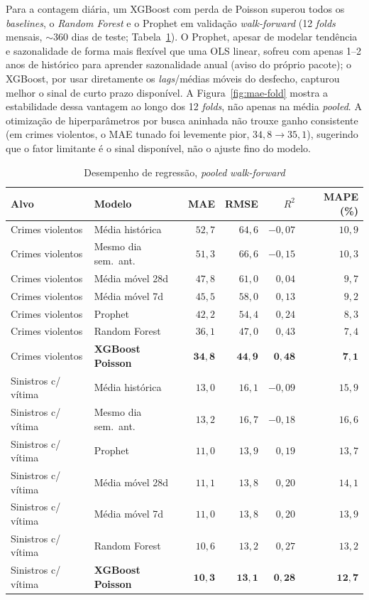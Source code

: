 \documentclass[12pt]{article}
\begin{document}
Para a contagem diária, um XGBoost com perda de Poisson superou todos os
\emph{baselines}, o \emph{Random Forest} e o Prophet \cite{taylor2018} em
validação \emph{walk-forward} (12 \emph{folds} mensais, $\sim$360 dias de
teste; Tabela~\ref{tab:regressao}). O Prophet, apesar de modelar
tendência e sazonalidade de forma mais flexível que uma OLS linear,
sofreu com apenas 1--2 anos de histórico para aprender sazonalidade
anual (aviso do próprio pacote); o XGBoost, por usar diretamente os
\emph{lags}/médias móveis do desfecho, capturou melhor o sinal de curto
prazo disponível. A Figura~\ref{fig:mae-fold} mostra a estabilidade dessa
vantagem ao longo dos 12 \emph{folds}, não apenas na média \emph{pooled}.
A otimização de hiperparâmetros por busca aninhada não trouxe ganho
consistente (em crimes violentos, o MAE tunado foi levemente pior,
$34,8\rightarrow35,1$), sugerindo que o fator limitante é o sinal
disponível, não o ajuste fino do modelo.

\begin{table}[ht]
\centering
\caption{Desempenho de regressão, \emph{pooled} \emph{walk-forward}}
\label{tab:regressao}
\small
\begin{tabular}{@{}llrrrr@{}}
\toprule
\textbf{Alvo} & \textbf{Modelo} & \textbf{MAE} & \textbf{RMSE} & \textbf{$R^2$} & \textbf{MAPE (\%)} \\
\midrule
Crimes violentos & Média histórica        & $52,7$ & $64,6$ & $-0,07$ & $10,9$ \\
Crimes violentos & Mesmo dia sem.\ ant.   & $51,3$ & $66,6$ & $-0,15$ & $10,3$ \\
Crimes violentos & Média móvel 28d        & $47,8$ & $61,0$ & $0,04$  & $9,7$  \\
Crimes violentos & Média móvel 7d         & $45,5$ & $58,0$ & $0,13$  & $9,2$  \\
Crimes violentos & Prophet                & $42,2$ & $54,4$ & $0,24$  & $8,3$  \\
Crimes violentos & Random Forest          & $36,1$ & $47,0$ & $0,43$  & $7,4$  \\
Crimes violentos & \textbf{XGBoost Poisson} & $\mathbf{34,8}$ & $\mathbf{44,9}$ & $\mathbf{0,48}$ & $\mathbf{7,1}$ \\
\midrule
Sinistros c/ vítima & Média histórica      & $13,0$ & $16,1$ & $-0,09$ & $15,9$ \\
Sinistros c/ vítima & Mesmo dia sem.\ ant. & $13,2$ & $16,7$ & $-0,18$ & $16,6$ \\
Sinistros c/ vítima & Prophet              & $11,0$ & $13,9$ & $0,19$  & $13,7$ \\
Sinistros c/ vítima & Média móvel 28d      & $11,1$ & $13,8$ & $0,20$  & $14,1$ \\
Sinistros c/ vítima & Média móvel 7d       & $11,0$ & $13,8$ & $0,20$  & $13,9$ \\
Sinistros c/ vítima & Random Forest        & $10,6$ & $13,2$ & $0,27$  & $13,2$ \\
Sinistros c/ vítima & \textbf{XGBoost Poisson} & $\mathbf{10,3}$ & $\mathbf{13,1}$ & $\mathbf{0,28}$ & $\mathbf{12,7}$ \\
\bottomrule
\end{tabular}
\end{table}
\end{document}
